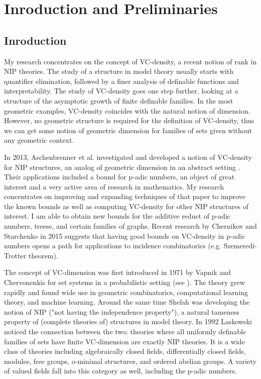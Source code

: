 \chapter{Inroduction and Preliminaries}

\section{Inroduction}

My research concentrates on the concept of VC-density, a recent notion of rank in NIP theories.
The study of a structure in model theory usually starts with quantifier elimination, followed by a finer analysis of definable functions and interpretability.
The study of VC-density goes one step further, looking at a structure of the asymptotic growth of finite definable families.
In the most geometric examples, VC-density coincides with the natural notion of dimension.
However, no geometric structure is required for the definition of VC-density, thus we can get some notion of geometric dimension for families of sets given without any geometric context.

In 2013, Aschenbrenner et al. investigated and developed a notion of VC-density for NIP structures, an analog of geometric dimension in an abstract setting \cite{density}. Their applications included a bound for p-adic numbers, an object of great interest and a very active area of research in mathematics. My research concentrates on improving and expanding techniques of that paper to improve the known bounds as well as computing VC-density for other NIP structures of interest. I am able to obtain new bounds for the additive reduct of p-adic numbers, treese, and certain families of graphs. Recent research by Chernikov and Starchenko in 2015 \cite{regularity} suggests that having good bounds on VC-density in p-adic numbers opens a path for applications to incidence combinatorics (e.g. Szemeredi-Trotter theorem).

The concept of VC-dimension was first introduced in 1971 by Vapnik and Chervonenkis for set systems in a probabilistic setting (see \cite{density}). The theory grew rapidly and found wide use in geometric combinatorics, computational learning theory, and machine learning. Around the same time Shelah was developing the notion of NIP ("not having the independence property"), a natural tameness property of (complete theories of) structures in model theory. In 1992 Laskowski noticed the connection between the two: theories where all uniformly definable families of sets have finite VC-dimension are exactly NIP theories. It is a wide class of theories including algebraically closed fields, differentially closed fields, modules, free groups, o-minimal structures, and ordered abelian groups. A variety of valued fields fall into this category as well, including the p-adic numbers.

